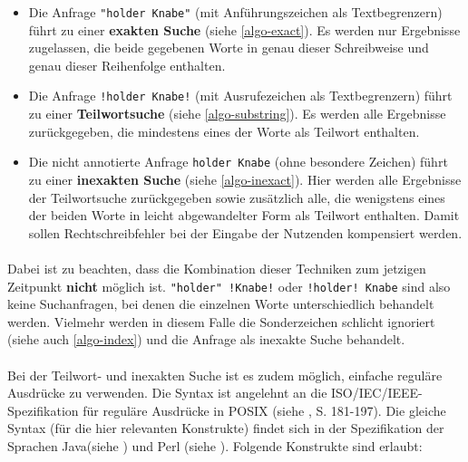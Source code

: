 \begin{itemize}
 \item Die Anfrage \texttt{"holder Knabe"} (mit Anführungszeichen als Textbegrenzern) führt zu einer \textbf{exakten Suche} (siehe \ref{algo-exact}). Es werden nur Ergebnisse zugelassen, die beide gegebenen Worte in genau dieser Schreibweise und genau dieser Reihenfolge enthalten.
\item Die Anfrage \texttt{!holder Knabe!} (mit Ausrufezeichen als Textbegrenzern) führt zu einer \textbf{Teilwortsuche} (siehe \ref{algo-substring}). Es werden alle Ergebnisse zurückgegeben, die mindestens eines der Worte als Teilwort enthalten.
\item Die nicht annotierte Anfrage \texttt{holder Knabe} (ohne besondere Zeichen) führt zu einer \textbf{inexakten Suche} (siehe \ref{algo-inexact}). Hier werden alle Ergebnisse der Teilwortsuche zurückgegeben sowie zusätzlich alle, die wenigstens eines der beiden Worte in leicht abgewandelter Form als Teilwort enthalten. Damit sollen Rechtschreibfehler bei der Eingabe der Nutzenden kompensiert werden.
\end{itemize}

\paragraph{} Dabei ist zu beachten, dass die Kombination dieser Techniken zum jetzigen Zeitpunkt \textbf{nicht} möglich ist. \texttt{"holder" !Knabe!} oder \texttt{!holder! Knabe} sind also keine Suchanfragen, bei denen die einzelnen Worte unterschiedlich behandelt werden. Vielmehr werden in diesem Falle die Sonderzeichen schlicht ignoriert (siehe auch \ref{algo-index}) und die Anfrage als inexakte Suche behandelt.
\paragraph{} Bei der Teilwort- und inexakten Suche ist es zudem möglich, einfache reguläre Ausdrücke zu verwenden. Die Syntax ist angelehnt an die ISO/IEC/IEEE-Spezifikation für reguläre Ausdrücke in POSIX (siehe \cite{regexISO}, S. 181-197). Die gleiche Syntax (für die hier relevanten Konstrukte) findet sich in der Spezifikation der Sprachen Java\texttrademark (siehe \cite{javaRegex}) und Perl (siehe \cite{perlRegex}). Folgende Konstrukte sind erlaubt:

\paragraph{}

